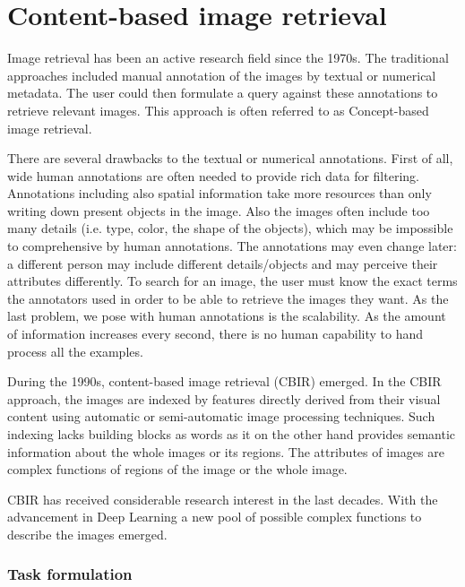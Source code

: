 \chapter{Content-based image retrieval}

Image retrieval has been an active research field since the 1970s. The traditional approaches included manual annotation of the images by textual or numerical metadata. The user could then formulate a query against these annotations to retrieve relevant images. This approach is often referred to as Concept-based image retrieval.

There are several drawbacks to the textual or numerical annotations. First of all, wide human annotations are often needed to provide rich data for filtering. Annotations including also spatial information take more resources than only writing down present objects in the image. Also the images often include too many details (i.e. type, color, the shape of the objects), which may be impossible to comprehensive by human annotations.  The annotations may even change later: a different person may include different details/objects and may perceive their attributes differently. To search for an image, the user must know the exact terms the annotators used in order to be able to retrieve the images they want. As the last problem, we pose with human annotations is the scalability. As the amount of information increases every second, there is no human capability to hand process all the examples.

During the 1990s, content-based image retrieval (CBIR) emerged. In the CBIR approach, the images are indexed by features directly derived from their visual content using automatic or semi-automatic image processing techniques. Such indexing lacks building blocks as words as it on the other hand provides semantic information about the whole images or its regions. The attributes of images are complex functions of regions of the image or the whole image.

CBIR has received considerable research interest in the last decades. With the advancement in Deep Learning a new pool of possible complex functions to describe the images emerged. 

\subsection*{Task formulation}



